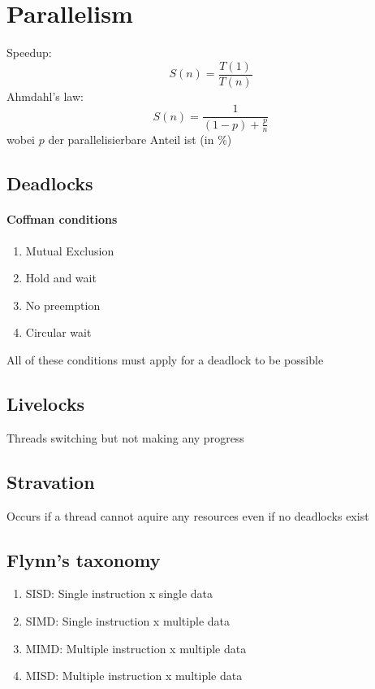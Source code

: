 \section{Parallelism}
Speedup:
$$S(n) = \frac{T(1)}{T(n)}$$
Ahmdahl's law:
$$ S(n) = \frac{1}{(1 - p)+\frac{p}{n}}$$
wobei $p$ der parallelisierbare Anteil ist (in \%)
\subsection{Deadlocks}
\paragraph{Coffman conditions}
\begin{enumerate}
	\item Mutual Exclusion
	\item Hold and wait
	\item No preemption
	\item Circular wait
\end{enumerate}
All of these conditions must apply for a deadlock to be possible
\subsection{Livelocks}
Threads switching but not making any progress
\subsection{Stravation}
Occurs if a thread cannot aquire any resources even if no deadlocks exist

\subsection{Flynn's taxonomy}

\begin{enumerate}
	\item SISD: Single instruction x single data
	\item SIMD: Single instruction x multiple data
	\item MIMD: Multiple instruction x multiple data	
	\item MISD: Multiple instruction x multiple data
\end{enumerate}
